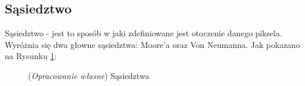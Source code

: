 \documentclass{article}
\begin{document}
        \subsection{Sąsiedztwo}
        {
            \Large
            \justifying
            \quad
            Sąsiedztwo - jest to sposób w jaki zdefiniowane jest otoczenie danego piksela.
            Wyróżnia się dwa głowne sąsiedztwa: Moore'a oraz Von Neumanna. Jak pokazano na Rysunku \ref{fig:Neighbourhood}:
        }
        \begin{figure}[H]
            \centering
            \qquad
            \caption{(\textit{Opracowanie własne}) Sąsiedztwa}
            \label{fig:Neighbourhood}
        \end{figure}
\end{document}
